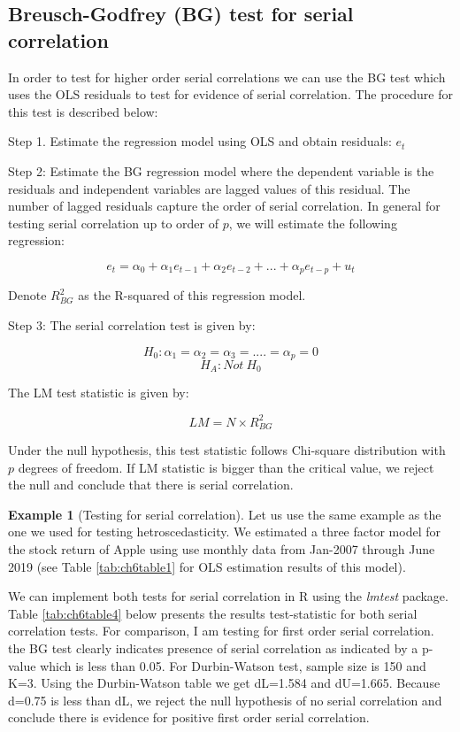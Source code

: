 \documentclass[
]{book}
\theoremstyle{definition}
\theoremstyle{definition}
\newtheorem{example}{Example}[chapter]
\theoremstyle{definition}
\theoremstyle{definition}
\theoremstyle{remark}
\begin{document}
\hypertarget{breusch-godfrey-bg-test-for-serial-correlation}{%
\subsection{Breusch-Godfrey (BG) test for serial correlation}\label{breusch-godfrey-bg-test-for-serial-correlation}}

In order to test for higher order serial correlations we can use the BG test which uses the OLS residuals to test for evidence of serial correlation. The procedure for this test is described below:

Step 1. Estimate the regression model using OLS and obtain residuals: \(e_t\)

Step 2: Estimate the BG regression model where the dependent variable is the residuals and independent variables are lagged values of this residual. The number of lagged residuals capture the order of serial correlation. In general for testing serial correlation up to order of \(p\), we will estimate the following regression:

\[e_t=\alpha_0 + \alpha_1 e_{t-1} + \alpha_2 e_{t-2} +...+ \alpha_p e_{t-p} + u_t\]

Denote \(R^2_{BG}\) as the R-squared of this regression model.

Step 3: The serial correlation test is given by:

\[H_0: \alpha_1=\alpha_2=\alpha_3=....=\alpha_p=0\]
\[H_A: Not \ H_0\]

The LM test statistic is given by:

\[LM=N\times R^2_{BG}\]

Under the null hypothesis, this test statistic follows Chi-square distribution with \(p\) degrees of freedom. If LM statistic is bigger than the critical value, we reject the null and conclude that there is serial correlation.

\begin{example}[Testing for serial correlation]
\protect\hypertarget{exm:unnamed-chunk-100}{}\label{exm:unnamed-chunk-100}Let us use the same example as the one we used for testing hetroscedasticity. We estimated a three factor model for the stock return of Apple using use monthly data from Jan-2007 through June 2019 (see Table \ref{tab:ch6table1} for OLS estimation results of this model).

We can implement both tests for serial correlation in R using the \emph{lmtest} package. Table \ref{tab:ch6table4} below presents the results test-statistic for both serial correlation tests. For comparison, I am testing for first order serial correlation. the BG test clearly indicates presence of serial correlation as indicated by a p-value which is less than 0.05. For Durbin-Watson test, sample size is 150 and K=3. Using the Durbin-Watson table we get dL=1.584 and dU=1.665. Because d=0.75 is less than dL, we reject the null hypothesis of no serial correlation and conclude there is evidence for positive first order serial correlation.
\end{example}
\end{document}
